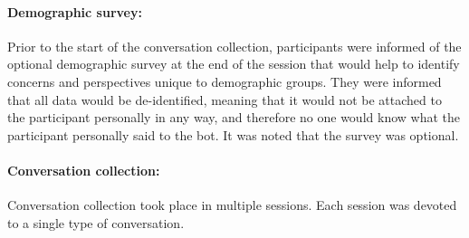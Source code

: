 \documentclass{article}
\begin{document}
\paragraph{Demographic survey:} Prior to the start of the conversation collection, participants were informed of the optional demographic survey at the end of the session that would help to identify concerns and perspectives unique to demographic groups. They were informed that all data would be de-identified, meaning that it would not be attached to the participant personally in any way, and therefore no one would know what the participant personally said to the bot. It was noted that the survey was optional. 

\paragraph{Conversation collection:} Conversation collection took place in multiple sessions. Each session was devoted to a single type of conversation. 
\end{document}
